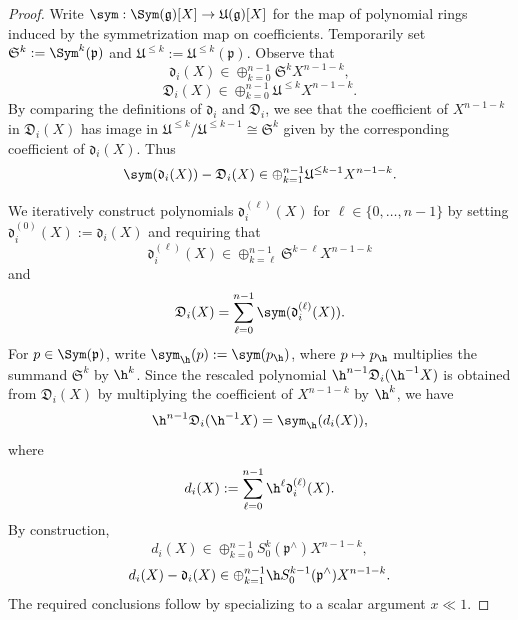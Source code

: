 \begin{proof}
  Write $\sym : \Sym(\mathfrak{g})[X] \rightarrow \mathfrak{U}(\mathfrak{g})[X]$ for the map of polynomial rings induced by the symmetrization map on coefficients.
  Temporarily set $\mathfrak{S}^k := \Sym^k(\mathfrak{p})$ and $\mathfrak{U}^{\leq k} := \mathfrak{U}^{\leq k}(\mathfrak{p})$.  Observe that
  \[
    \mathfrak{d}_i(X) \in \oplus_{k=0}^{n-1} \mathfrak{S}^k X^{n-1-k},
  \]
  \[
    \mathfrak{D}_i(X) \in \oplus_{k=0}^{n-1} \mathfrak{U}^{\leq k} X^{n-1-k}.
  \]
  By comparing the definitions of $\mathfrak{d}_i$ and $\mathfrak{D}_i$, we see that the coefficient of $X^{n-1-k}$ in $\mathfrak{D}_i(X)$ has image in $\mathfrak{U}^{\leq k} / \mathfrak{U}^{\leq k-1} \cong \mathfrak{S}^k$ given by the corresponding coefficient of $\mathfrak{d}_i(X)$.  Thus
  \[
    \sym(\mathfrak{d}_i(X)) - \mathfrak{D}_i(X) \in \oplus_{k = 1}^{n-1} \mathfrak{U}^{\leq k-1} X^{n-1-k}.
  \]

  We iteratively construct polynomials $\mathfrak{d}_i^{(\ell)}(X)$ for $\ell \in \{0,\dotsc,n-1\}$ by setting $\mathfrak{d}_i^{(0)}(X) := \mathfrak{d}_i(X)$ and requiring that
  \[
    \mathfrak{d}_i^{(\ell)}(X) \in \oplus_{k=\ell}^{n-1} \mathfrak{S}^{k-\ell} X^{n-1-k}
  \]
  and
  \[
    \mathfrak{D}_i(X) = \sum_{\ell=0}^{n-1} \sym(\mathfrak{d}_i^{(\ell)}(X)).
  \]
  For $p \in \Sym(\mathfrak{p})$, write $\sym_{\h}(p) := \sym(p_{\h})$, where $p \mapsto p_{\h}$ multiplies the summand $\mathfrak{S}^k$ by $\h^k$.  Since the rescaled polynomial $\h^{n-1}\mathfrak{D}_i(\h^{-1} X)$ is obtained from $\mathfrak{D}_i(X)$ by multiplying the coefficient of $X^{n-1-k}$ by $\h^k$, we have
  \[
    \h^{n-1} \mathfrak{D}_i(\h^{-1} X) = \sym_{\h}(d_i(X)),
  \]
  where
  \[
    d_i(X) := \sum_{\ell =0 }^{n-1} \h^{\ell} \mathfrak{d}_i^{(\ell)}(X).
  \]
  By construction,
  \[
    d_i(X) \in \oplus_{k=0}^{n-1} S_0^k(\mathfrak{p}^\wedge) X^{n-1-k},
  \]
  \[
    d_i(X) - \mathfrak{d}_i(X) \in \oplus_{k=1}^{n-1} \h S_0^{k-1}(\mathfrak{p}^\wedge) X^{n-1-k}.
  \]
  The required conclusions follow by specializing to a scalar argument $x \ll 1$.
\end{proof}

